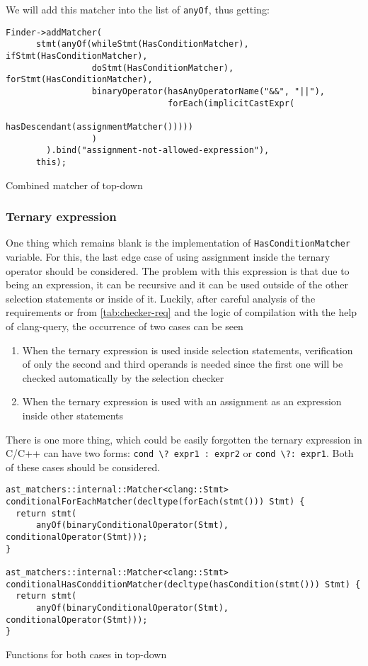 We will add this matcher into the list of \lstinline{anyOf}, thus getting:

\begin{listing}[H]
\begin{verbatim}
Finder->addMatcher(
      stmt(anyOf(whileStmt(HasConditionMatcher), ifStmt(HasConditionMatcher),
                 doStmt(HasConditionMatcher), forStmt(HasConditionMatcher),
                 binaryOperator(hasAnyOperatorName("&&", "||"),
                                forEach(implicitCastExpr(
                                    hasDescendant(assignmentMatcher()))))
                 )
        ).bind("assignment-not-allowed-expression"),
      this);
\end{verbatim}
\caption{Combined matcher of top-down}
\end{listing}

\subsubsection{Ternary expression}

One thing which remains blank is the implementation of \lstinline{HasConditionMatcher} variable. For this, the last edge case of using assignment inside the ternary operator should be considered. The problem with this expression is that due to being an expression, it can be recursive and it can be used outside of the other selection statements or inside of it. Luckily, after careful analysis of the requirements or from \ref{tab:checker-req} and the logic of compilation with the help of clang-query, the occurrence of two cases can be seen
\begin{enumerate}
    \item When the ternary expression is used inside selection statements, verification of only the second and third operands is needed since the first one will be checked automatically by the selection checker
    \item When the ternary expression is used with an assignment as an expression inside other statements
\end{enumerate}

There is one more thing, which could be easily forgotten the ternary expression in C/C++ can have two forms: \lstinline{cond \? expr1 : expr2} or \lstinline{cond \?: expr1}. Both of these cases should be considered.

\begin{listing}[H]
\begin{verbatim}
ast_matchers::internal::Matcher<clang::Stmt>
conditionalForEachMatcher(decltype(forEach(stmt())) Stmt) {
  return stmt(
      anyOf(binaryConditionalOperator(Stmt), conditionalOperator(Stmt)));
}

ast_matchers::internal::Matcher<clang::Stmt>
conditionalHasCondditionMatcher(decltype(hasCondition(stmt())) Stmt) {
  return stmt(
      anyOf(binaryConditionalOperator(Stmt), conditionalOperator(Stmt)));
}
\end{verbatim}
\caption{Functions for both cases in top-down}
\end{listing}

